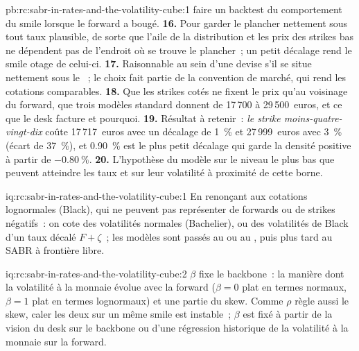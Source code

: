 \begin{solution}{pb:rc:sabr-in-rates-and-the-volatility-cube:1}
faire un backtest du comportement du smile lorsque le forward a bougé.
\textbf{16.} Pour garder le plancher nettement sous tout taux plausible, de sorte que l'aile de
la distribution et les prix des strikes bas ne dépendent pas de l'endroit où se trouve le
plancher~; un petit décalage rend le smile otage de celui-ci.
\textbf{17.} Raisonnable au sein d'une devise s'il se situe nettement sous le ~; le choix fait partie de la convention de marché, qui rend les cotations
comparables.
\textbf{18.} Que les strikes cotés ne fixent le prix qu'au voisinage du forward, que trois
modèles standard donnent de 17\,700 à 29\,500~euros, et ce que le desk facture et pourquoi.
\textbf{19.} Résultat à retenir~: \emph{le strike moins-quatre-vingt-dix} coûte 17\,717~euros avec un décalage de 1~\%
et 27\,999~euros avec 3~\% (écart de 37~\%), et 0.90~\% est le plus petit décalage
qui garde la densité positive à partir de $-0.80~\%$.
\textbf{20.} L'hypothèse du modèle sur le niveau le plus bas que peuvent atteindre les taux et sur
leur volatilité à proximité de cette borne.
\end{solution}

\begin{solution}{iq:rc:sabr-in-rates-and-the-volatility-cube:1}
En renonçant aux cotations lognormales (Black), qui ne peuvent pas représenter de forwards
ou de strikes négatifs~: on cote des volatilités normales (Bachelier), ou des volatilités de Black d'un
taux décalé $F+\zeta$~; les modèles sont passés au  ou au , puis plus tard
au SABR à frontière libre.
\end{solution}

\begin{solution}{iq:rc:sabr-in-rates-and-the-volatility-cube:2}
$\beta$ fixe le backbone~: la manière dont la volatilité à la monnaie évolue avec la
forward ($\beta=0$ plat en termes normaux, $\beta=1$ plat en termes lognormaux) et une
partie du skew. Comme $\rho$ règle aussi le skew, caler les deux sur un même smile est
instable~; $\beta$ est fixé à partir de la vision du desk sur le backbone ou d'une
régression historique de la volatilité à la monnaie sur la forward.
\end{solution}

